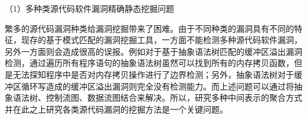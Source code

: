 


（1）多种类源代码软件漏洞精确静态挖掘问题

繁多的源代码漏洞种类给漏洞挖掘带来了困难。由于不同种类的漏洞具有不同的特 %
征，现存的基于模式匹配的漏洞挖掘工具，一方面不能检测多种源代码软件漏洞，另外一方面则会造成很高的误报。例如对于基于抽象语法树匹配的缓冲区溢出漏洞检测，通过遍历所有程序语句的抽象语法树虽然可以找到所有的内存拷贝函数，但是无法探知程序中是否对内存拷贝操作进行了边界检测；另外，抽象语法树对于缓冲区循环写造成的缓冲区溢出漏洞则完全没有检测能力。而上述问题可以通过将抽象语法树、控制流图、数据流图结合来解决。所以，研究多种中间表示的聚合方式并在此之上研究各类源代码漏洞的挖掘方法是一个关键问题。

